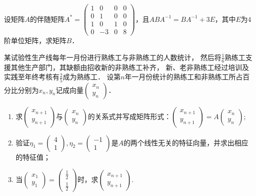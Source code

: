 \documentclass[plain,noanswer,medmath]{../../template/jnuexam}
\begin{document}
\begin{problem}
设矩阵$A$的伴随矩阵$A^* = \begin{pmatrix}
  1 &  0 & 0 & 0 \\
  0 &  1 & 0 & 0 \\
  1 &  0 & 1 & 0 \\
  0 & -3 & 0 & 8
\end{pmatrix}$，且$AB A^{-1} = BA^{-1} + 3E$，其中$E$为$4$阶单位矩阵，求矩阵$B$．
\end{problem}



\begin{problem}
某试验性生产线每年一月份进行熟练工与非熟练工的人数统计，
然后将$\frac{1}{6}$熟练工支援其他生产部门，其缺额由招收新的非熟练工补齐，
新、老非熟练工经过培训及实践至年终考核有$\frac{2}{5}$成为熟练工．
设第$n$年一月份统计的熟练工和非熟练工所占百分比分别为$x_n,$$y_n$记成向量$\begin{pmatrix}
  x_n \\
  y_n
\end{pmatrix}$．
\begin{enumerate}
\item 求$\begin{pmatrix}
  x_{n + 1} \\
  y_{n + 1}
\end{pmatrix}$与$\begin{pmatrix}
  x_n \\
  y_n
\end{pmatrix}$的关系式并写成矩阵形式：$\begin{pmatrix}
  x_{n + 1} \\
  y_{n + 1}
\end{pmatrix} = A\begin{pmatrix}
  x_n \\
  y_n
\end{pmatrix};$
\item 验证$\eta_1 = \begin{pmatrix}
  4 \\
  1
\end{pmatrix},\eta_2 = \begin{pmatrix}
  -1 \\
  1
\end{pmatrix}$是$A$的两个线性无关的特征向量，并求出相应的特征值；
\item 当$\begin{pmatrix}
  x_1 \\
  y_1
\end{pmatrix} = \begin{pmatrix}
  \frac{1}{2} \\
  \frac{1}{2}
\end{pmatrix}$时，求$\begin{pmatrix}
  x_{n + 1} \\
  y_{n + 1}
\end{pmatrix}.$
\end{enumerate}
\end{problem}
\end{document}
